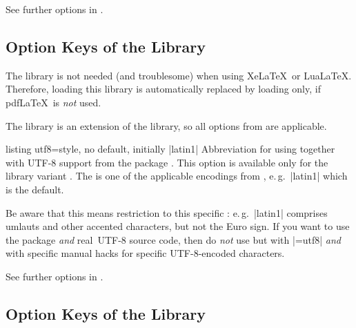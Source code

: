 See further options in .


\clearpage
\subsection{Option Keys of the  Library}
\begin{marker}
The  library is not needed (and troublesome) when using Xe\LaTeX\ or Lua\LaTeX.
Therefore, loading this library is automatically replaced by loading
 only, if pdf\LaTeX\ is \emph{not} used.
\end{marker}

The  library is an extension of the
 library, so
all options from  are applicable.

\begin{docTcbKey}{listing utf8}{=}{style, no default, initially |latin1|}
  Abbreviation for using 
  together with UTF-8 support from the package  \cite{oberdiek:listingsutf8}.
  This option is available only for the library variant .
  The  is one of
  the applicable encodings from \cite{oberdiek:listingsutf8}, e.\,g.\ |latin1|
  which is the default.\par
  Be aware that this means restriction to this specific :
  e.\,g.\ |latin1| comprises umlauts and other accented characters, but not
  the Euro sign. If you want to use the  package \emph{and} \flqq real\frqq\
  UTF-8 source code, then do \emph{not} use  but 
  with
  |=utf8|
  \emph{and} with specific manual hacks for specific UTF-8-encoded characters.

\end{docTcbKey}

See further options in .

\clearpage
\subsection{Option Keys of the  Library}

